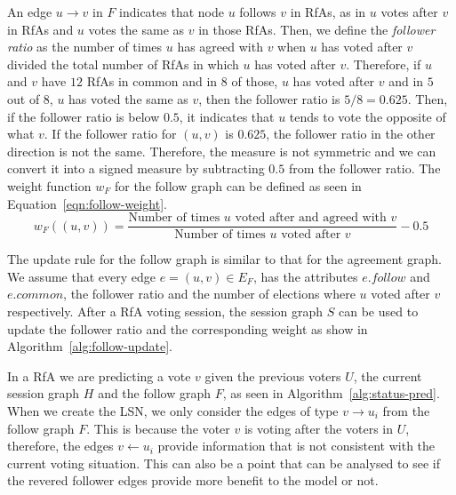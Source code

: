 An edge $u \rightarrow v$ in $F$ indicates that node $u$ follows $v$ in RfAs, as in $u$ votes after $v$ in RfAs and $u$ votes the same as $v$ in those RfAs.
Then, we define the \textit{follower ratio} as the number of times $u$ has agreed with $v$ when $u$ has voted after $v$ divided the total number of RfAs in which $u$ has voted after $v$.
Therefore, if $u$ and $v$ have $12$ RfAs in common and in $8$ of those, $u$ has voted after $v$  and in $5$ out of $8$, $u$ has voted the same as $v$, then the follower ratio is $5/8 = 0.625$.  
Then, if the follower ratio is below $0.5$, it indicates that $u$ tends to vote the opposite of what $v$.
If the follower ratio for $(u,v)$ is $0.625$, the follower ratio in the other direction is not the same.
Therefore, the measure is not symmetric and we can convert it into a signed measure by subtracting $0.5$ from the follower ratio.
The weight function $w_{F}$ for the follow graph can be defined as seen in Equation~\eqref{eqn:follow-weight}. 
\begin{equation}
    \label{eqn:follow-weight}
    w_{F}((u,v)) = \frac{\text{Number of times } u \text{ voted after and agreed with } v }{\text{Number of times } u \text{ voted after } v} -0.5
\end{equation}

The update rule for the follow graph is similar to that for the agreement graph.
We assume that every edge $e=(u,v) \in E_{F}$, has the attributes $e.follow$ and $e.common$, the follower ratio and the number of elections where $u$ voted after $v$ respectively.
After a RfA voting session, the session graph $S$ can be used to update the follower ratio and the corresponding weight as show in Algorithm~\ref{alg:follow-update}.

In a RfA we are predicting a vote $v$ given the previous voters $U$, the current session graph $H$ and the follow graph $F$, as seen in Algorithm~\ref{alg:status-pred}.
When we create the LSN, we only consider the edges of type $v \rightarrow u_{i}$ from the follow graph $F$.
This is because the voter $v$ is voting after the voters in $U$, therefore, the edges $v \leftarrow u_{i}$ provide information that is not consistent with the current voting situation.
This can also be a point that can be analysed to see if the revered follower edges provide more benefit to the model or not.

